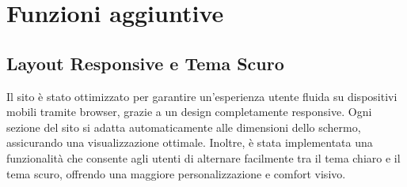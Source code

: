 \section{Funzioni aggiuntive}

\subsection{Layout Responsive e Tema Scuro}
Il sito è stato ottimizzato per garantire un'esperienza utente fluida su dispositivi mobili tramite browser, grazie a un design completamente responsive. Ogni sezione del sito si adatta automaticamente alle dimensioni dello schermo, assicurando una visualizzazione ottimale. Inoltre, è stata implementata una funzionalità che consente agli utenti di alternare facilmente tra il tema chiaro e il tema scuro, offrendo una maggiore personalizzazione e comfort visivo.
